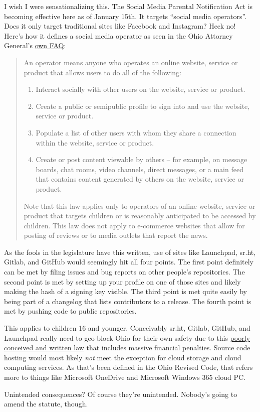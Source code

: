 I wish I were sensationalizing this. The Social Media Parental
Notification Act is becoming effective here as of January 15th. It
targets ``social media operators''. Does it only target traditional
sites like Facebook and Instagram? Heck no! Here's how it defines a
social media operator as seen in the Ohio Attorney General's
\href{https://web.archive.org/web/20231230000932/https://www.ohioprotects.org/faq}{own
FAQ}:

\begin{quote}
An operator means anyone who operates an online website, service or
product that allows users to do all of the following:

\begin{enumerate}
\def\labelenumi{\arabic{enumi}.}
\tightlist
\item
  Interact socially with other users on the website, service or product.
\item
  Create a public or semipublic profile to sign into and use the
  website, service or product.
\item
  Populate a list of other users with whom they share a connection
  within the website, service or product.
\item
  Create or post content viewable by others -- for example, on message
  boards, chat rooms, video channels, direct messages, or a main feed
  that contains content generated by others on the website, service or
  product.
\end{enumerate}

Note that this law applies only to operators of an online website,
service or product that targets children or is reasonably anticipated to
be accessed by children. This law does not apply to e-commerce websites
that allow for posting of reviews or to media outlets that report the
news.
\end{quote}

As the fools in the legislature have this written, use of sites like
Launchpad, sr.ht, Gitlab, and GitHub would seemingly hit all four
points. The first point definitely can be met by filing issues and bug
reports on other people's repositories. The second point is met by
setting up your profile on one of those sites and likely making the hash
of a signing key visible. The third point is met quite easily by being
part of a changelog that lists contributors to a release. The fourth
point is met by pushing code to public repositories.

This applies to children 16 and younger. Conceivably sr.ht, Gitlab,
GitHub, and Launchpad really need to geo-block Ohio for their own safety
due to this
\href{https://web.archive.org/web/20240101080348/https://codes.ohio.gov/ohio-revised-code/section-1349.09}{poorly
conceived and written law} that includes massive financial penalties.
Source code hosting would most likely \emph{not} meet the exception for
cloud storage and cloud computing services. As that's been defined in
the Ohio Revised Code, that refers more to things like Microsoft
OneDrive and Microsoft Windows 365 cloud PC.

Unintended consequences? Of course they're unintended. Nobody's going to
amend the statute, though.
